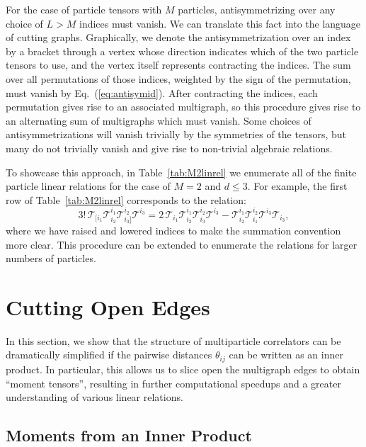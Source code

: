 \documentclass[aps,prd,floatfix,preprintnumbers,twocolumn,groupedaddress,nofootinbib,longbibliography,10pt]{revtex4-1}
\DeclareRobustCommand{\Tab}[1]{Table~\ref{#1}}
\DeclareRobustCommand{\Eq}[1]{Eq.~(\ref{#1})}
\begin{document}
For the case of particle tensors with $M$ particles, antisymmetrizing over any choice of $L>M$ indices must vanish.
%
We can translate this fact into the language of cutting graphs.
%
Graphically, we denote the antisymmetrization over an index by a bracket through a vertex whose direction indicates which of the two particle tensors to use, and the vertex itself represents contracting the indices.
%
The sum over all permutations of those indices, weighted by the sign of the permutation, must vanish by \Eq{eq:antisymid}.
%
After contracting the indices, each permutation gives rise to an associated multigraph, so this procedure gives rise to an alternating sum of multigraphs which must vanish.
%
Some choices of antisymmetrizations will vanish trivially by the symmetries of the tensors, but many do not trivially vanish and give rise to non-trivial algebraic relations.


To showcase this approach, in \Tab{tab:M2linrel} we enumerate all of the finite particle linear relations for the case of $M=2$ and $d\le 3$.
%
For example, the first row of \Tab{tab:M2linrel} corresponds to the relation:
%
\begin{equation}
3!\,\mathcal{T}_{[i_1}  \mathcal{T}^{i_1}_{i_2} \mathcal{T}^{i_2}_{i_3 ]} \mathcal{T}^{i_3} = 2 \, \mathcal{T}_{i_1}  \mathcal{T}^{i_1}_{i_2} \mathcal{T}^{i_2}_{i_3} \mathcal{T}^{i_3} -  \mathcal{T}^{i_1}_{i_2} \mathcal{T}^{i_2}_{i_1}   \mathcal{T}^{i_3} \mathcal{T}_{i_3},
\end{equation}
%
where we have raised and lowered indices to make the summation convention more clear.
%
This procedure can be extended to enumerate the relations for larger numbers of particles.



\section{Cutting Open Edges}
\label{sec:edges}


In this section, we show that the structure of multiparticle correlators can be dramatically simplified if the pairwise distances $\theta_{ij}$ can be written as an inner product.
%
In particular, this allows us to slice open the multigraph edges to obtain ``moment tensors'', resulting in further computational speedups and a greater understanding of various linear relations.


\subsection{Moments from an Inner Product}
\label{subsec:innerproduct}
\end{document}
